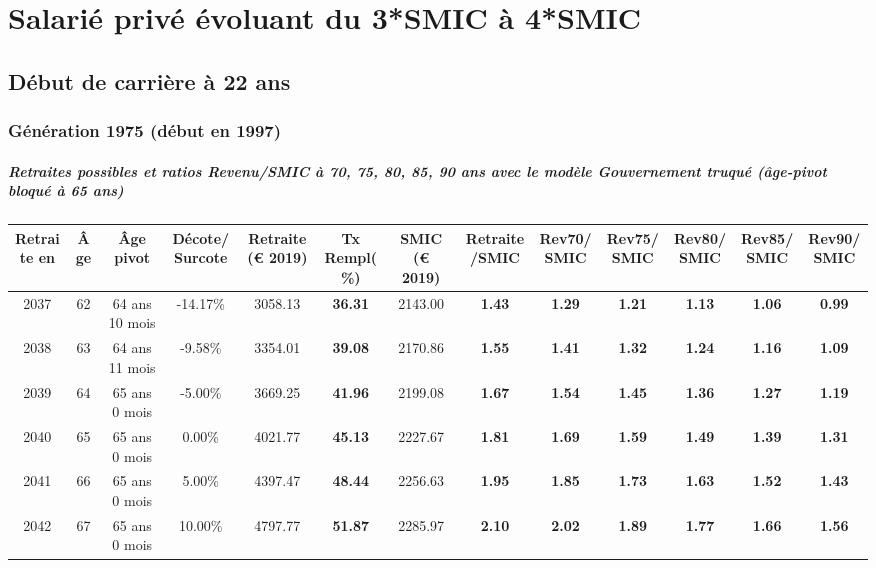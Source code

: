 \newpage 
 
\chapter{Salarié privé évoluant du 3*SMIC à 4*SMIC} 


 \addto{\captionsenglish}{ \renewcommand{\mtctitle}{}} \setcounter{minitocdepth}{2} 
 \minitoc \newpage 

\section{Début de carrière à 22 ans} 

\subsection{Génération 1975 (début en 1997)} 

\paragraph{Retraites possibles et ratios Revenu/SMIC à 70, 75, 80, 85, 90 ans avec le modèle \emph{Gouvernement truqué (âge-pivot bloqué à 65 ans)}}  
 
{ \scriptsize \begin{center} 
\begin{tabular}[htb]{|c|c||c|c||c|c||c||c|c|c|c|c|c|} 
\hline 
 Retraite en &  Âge &  Âge pivot &  Décote/Surcote &  Retraite (\euro{} 2019) &  Tx Rempl(\%) &  SMIC (\euro{} 2019) &  Retraite/SMIC &  Rev70/SMIC &  Rev75/SMIC &  Rev80/SMIC &  Rev85/SMIC &  Rev90/SMIC \\ 
\hline \hline 
 2037 &  62 &  64 ans 10 mois &  -14.17\% &  3058.13 &  {\bf 36.31} &  2143.00 &  {\bf 1.43} &  {\bf 1.29} &  {\bf 1.21} &  {\bf 1.13} &  {\bf 1.06} &  {\bf {\color{red} 0.99}} \\ 
\hline 
 2038 &  63 &  64 ans 11 mois &  -9.58\% &  3354.01 &  {\bf 39.08} &  2170.86 &  {\bf 1.55} &  {\bf 1.41} &  {\bf 1.32} &  {\bf 1.24} &  {\bf 1.16} &  {\bf 1.09} \\ 
\hline 
 2039 &  64 &  65 ans 0 mois &  -5.00\% &  3669.25 &  {\bf 41.96} &  2199.08 &  {\bf 1.67} &  {\bf 1.54} &  {\bf 1.45} &  {\bf 1.36} &  {\bf 1.27} &  {\bf 1.19} \\ 
\hline 
 2040 &  65 &  65 ans 0 mois &  0.00\% &  4021.77 &  {\bf 45.13} &  2227.67 &  {\bf 1.81} &  {\bf 1.69} &  {\bf 1.59} &  {\bf 1.49} &  {\bf 1.39} &  {\bf 1.31} \\ 
\hline 
 2041 &  66 &  65 ans 0 mois &  5.00\% &  4397.47 &  {\bf 48.44} &  2256.63 &  {\bf 1.95} &  {\bf 1.85} &  {\bf 1.73} &  {\bf 1.63} &  {\bf 1.52} &  {\bf 1.43} \\ 
\hline 
 2042 &  67 &  65 ans 0 mois &  10.00\% &  4797.77 &  {\bf 51.87} &  2285.97 &  {\bf 2.10} &  {\bf 2.02} &  {\bf 1.89} &  {\bf 1.77} &  {\bf 1.66} &  {\bf 1.56} \\ 
\hline 
\hline 
\end{tabular} 
\end{center} } 
